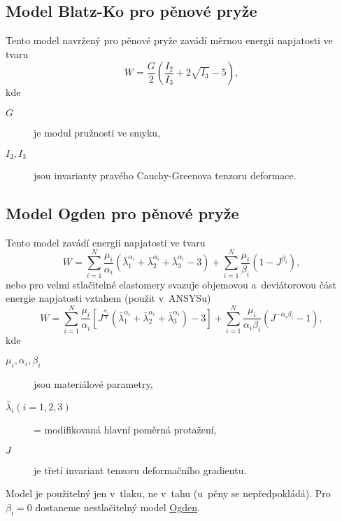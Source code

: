 
\subsection{Model Blatz-Ko pro pěnové pryže}\label{sec:blatz-ko}
Tento model navržený pro pěnové pryže zavádí měrnou energii napjatosti ve tvaru
\begin{equation}
	W = \frac{G}{2} \left( \frac{I_2}{I_3} + 2 \sqrt{I_3} - 5 \right),
\end{equation}
kde
\begin{description}
	\item[$G$] je modul pružnosti ve smyku,
	\item[$I_2, I_3$] jsou invarianty pravého Cauchy-Greenova tenzoru deformace.
\end{description}

\subsection{Model Ogden pro pěnové pryže}\label{sec:ogden-foam}
Tento model zavádí energii napjatosti ve tvaru
\begin{equation}
	W
	= \sum\limits_{i=1}^N \frac{\mu_i}{\alpha_i} \left( \bar{\lambda}_1^{\alpha_i} + \bar{\lambda}_2^{\alpha_i} + \bar{\lambda}_3^{\alpha_i} - 3 \right)
	+ \sum\limits_{i=1}^N \frac{\mu_i}{\beta_i} \left(1 - J^{\beta_i}\right),
\end{equation}
nebo pro velmi stlačitelné elastomery svazuje objemovou a~deviátorovou část energie napjatosti vztahem (použit v~ANSYSu)
\begin{equation}
	W
	= \sum\limits_{i=1}^N \frac{\mu_i}{\alpha_i} \left[ J^{\frac{\alpha_i}{3}} \left( \bar{\lambda}_1^{\alpha_i} + \bar{\lambda}_2^{\alpha_i} + \bar{\lambda}_3^{\alpha_i} \right) - 3 \right]
	+ \sum\limits_{i=1}^N \frac{\mu_i}{\alpha_i \beta_i} \left(J^{-\alpha_i \beta_i} - 1\right),
\end{equation}
kde
\begin{description}
	\item[$\mu_i, \alpha_i, \beta_i$] jsou materiálové parametry,
	\item[$\bar{\lambda}_i (i=1,2,3)$] = modifikovaná hlavní poměrná protažení,
	\item[$J$] je třetí invariant tenzoru deformačního gradientu.
\end{description}

Model je použitelný jen v~tlaku, ne v~tahu (u~pěny se nepředpokládá).
Pro $\beta_i = 0$ dostaneme nestlačitelný model \hyperref[sec:model-ogden]{Ogden}.

